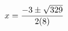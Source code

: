 \documentclass[preview]{standalone}
\begin{document}
\begin{align*}
\special{dvisvgm:raw <g id='unique000'>}x=\frac{-3\pm\sqrt{329}}{2(8)}\special{dvisvgm:raw </g>}
\end{align*}
\end{document}
